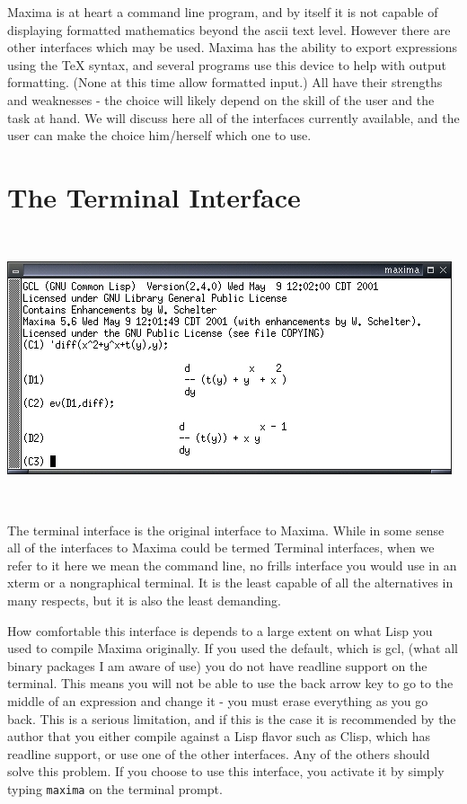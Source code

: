 
Maxima is at heart a command line program, and by itself it is not
capable of displaying formatted mathematics beyond the ascii text
level. However there are other interfaces which may be used. Maxima
has the ability to export expressions using the \TeX{} syntax, and
several programs use this device to help with output formatting. (None
at this time allow formatted input.) All have their strengths and
weaknesses - the choice will likely depend on the skill of the user
and the task at hand. We will discuss here all of the interfaces currently
available, and the user can make the choice him/herself which one
to use. 


\section{The Terminal Interface}

~

{\centering \includegraphics{images/terminalshot} \par }

~

The terminal interface is the original interface to Maxima. While
in some sense all of the interfaces to Maxima could be termed Terminal
interfaces, when we refer to it here we mean the command line, no
frills interface you would use in an xterm or a nongraphical terminal.
It is the least capable of all the alternatives in many respects,
but it is also the least demanding. 

How comfortable this interface is depends to a large extent on what
Lisp you used to compile Maxima originally. If you used the default,
which is gcl, (what all binary packages I am aware of use) you do
not have readline support on the terminal. This means you will not
be able to use the back arrow key to go to the middle of an expression
and change it - you must erase everything as you go back. This is
a serious limitation, and if this is the case it is recommended by
the author that you either compile against a Lisp flavor such as Clisp,
which has readline support, or use one of the other interfaces. Any
of the others should solve this problem. If you choose to use this
interface, you activate it by simply typing \texttt{maxima} on the
terminal prompt. 


